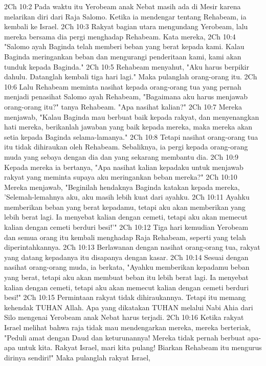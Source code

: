 2Ch 10:2  Pada waktu itu Yerobeam anak Nebat masih ada di Mesir karena melarikan diri dari Raja Salomo. Ketika ia mendengar tentang Rehabeam, ia kembali ke Israel.
2Ch 10:3  Rakyat bagian utara mengundang Yerobeam, lalu mereka bersama dia pergi menghadap Rehabeam. Kata mereka,
2Ch 10:4  "Salomo ayah Baginda telah memberi beban yang berat kepada kami. Kalau Baginda meringankan beban dan mengurangi penderitaan kami, kami akan tunduk kepada Baginda."
2Ch 10:5  Rehabeam menyahut, "Aku harus berpikir dahulu. Datanglah kembali tiga hari lagi." Maka pulanglah orang-orang itu.
2Ch 10:6  Lalu Rehabeam meminta nasihat kepada orang-orang tua yang pernah menjadi penasihat Salomo ayah Rehabeam, "Bagaimana aku harus menjawab orang-orang itu?" tanya Rehabeam. "Apa nasihat kalian?"
2Ch 10:7  Mereka menjawab, "Kalau Baginda mau berbuat baik kepada rakyat, dan menyenangkan hati mereka, berikanlah jawaban yang baik kepada mereka, maka mereka akan setia kepada Baginda selama-lamanya."
2Ch 10:8  Tetapi nasihat orang-orang tua itu tidak dihiraukan oleh Rehabeam. Sebaliknya, ia pergi kepada orang-orang muda yang sebaya dengan dia dan yang sekarang membantu dia.
2Ch 10:9  Kepada mereka ia bertanya, "Apa nasihat kalian kepadaku untuk menjawab rakyat yang meminta supaya aku meringankan beban mereka?"
2Ch 10:10  Mereka menjawab, "Beginilah hendaknya Baginda katakan kepada mereka, 'Selemah-lemahnya aku, aku masih lebih kuat dari ayahku.
2Ch 10:11  Ayahku memberikan beban yang berat kepadamu, tetapi aku akan memberikan yang lebih berat lagi. Ia menyebat kalian dengan cemeti, tetapi aku akan memecut kalian dengan cemeti berduri besi!'"
2Ch 10:12  Tiga hari kemudian Yerobeam dan semua orang itu kembali menghadap Raja Rehabeam, seperti yang telah diperintahkannya.
2Ch 10:13  Berlawanan dengan nasihat orang-orang tua, rakyat yang datang kepadanya itu disapanya dengan kasar.
2Ch 10:14  Sesuai dengan nasihat orang-orang muda, ia berkata, "Ayahku memberikan kepadamu beban yang berat, tetapi aku akan membuat beban itu lebih berat lagi. Ia menyebat kalian dengan cemeti, tetapi aku akan memecut kalian dengan cemeti berduri besi!"
2Ch 10:15  Permintaan rakyat tidak dihiraukannya. Tetapi itu memang kehendak TUHAN Allah. Apa yang dikatakan TUHAN melalui Nabi Ahia dari Silo mengenai Yerobeam anak Nebat harus terjadi.
2Ch 10:16  Ketika rakyat Israel melihat bahwa raja tidak mau mendengarkan mereka, mereka berteriak, "Peduli amat dengan Daud dan keturunannya! Mereka tidak pernah berbuat apa-apa untuk kita. Rakyat Israel, mari kita pulang! Biarkan Rehabeam itu mengurus dirinya sendiri!" Maka pulanglah rakyat Israel,

